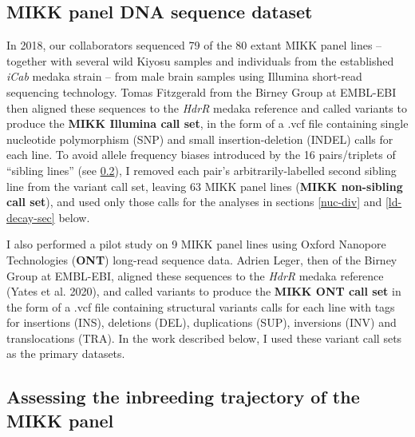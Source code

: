 \documentclass[
]{book}
\begin{document}
\hypertarget{non-sib-calls}{%
\subsection{MIKK panel DNA sequence dataset}\label{non-sib-calls}}

In 2018, our collaborators sequenced 79 of the 80 extant MIKK panel lines -- together with several wild Kiyosu samples and individuals from the established \emph{iCab} medaka strain -- from male brain samples using Illumina short-read sequencing technology. Tomas Fitzgerald from the Birney Group at EMBL-EBI then aligned these sequences to the \emph{HdrR} medaka reference and called variants to produce the \textbf{MIKK Illumina call set}, in the form of a .vcf file containing single nucleotide polymorphism (SNP) and small insertion-deletion (INDEL) calls for each line. To avoid allele frequency biases introduced by the 16 pairs/triplets of ``sibling lines'' (see \ref{inbreeding-sec}), I removed each pair's arbitrarily-labelled second sibling line from the variant call set, leaving 63 MIKK panel lines (\textbf{MIKK non-sibling call set}), and used only those calls for the analyses in sections \ref{nuc-div} and \ref{ld-decay-sec} below.

I also performed a pilot study on 9 MIKK panel lines using Oxford Nanopore Technologies (\textbf{ONT}) long-read sequence data. Adrien Leger, then of the Birney Group at EMBL-EBI, aligned these sequences to the \emph{HdrR} medaka reference (Yates et al. 2020), and called variants to produce the \textbf{MIKK ONT call set} in the form of a .vcf file containing structural variants calls for each line with tags for insertions (INS), deletions (DEL), duplications (SUP), inversions (INV) and translocations (TRA). In the work described below, I used these variant call sets as the primary datasets.

\hypertarget{inbreeding-sec}{%
\subsection{Assessing the inbreeding trajectory of the MIKK panel}\label{inbreeding-sec}}
\end{document}

